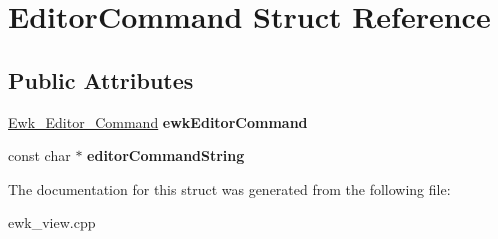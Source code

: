 \hypertarget{structEditorCommand}{\section{Editor\+Command Struct Reference}
\label{structEditorCommand}
}
\subsection*{Public Attributes}
\begin{DoxyCompactItemize}
\item 
\hypertarget{structEditorCommand_a4ef247e683d522e53cc8c693a7ab8b9f}{\hyperlink{ewk__view_8h_a0e80cc89f9b70518e512acc1969d3e6c}{Ewk\+\_\+\+Editor\+\_\+\+Command} {\bfseries ewk\+Editor\+Command}}\label{structEditorCommand_a4ef247e683d522e53cc8c693a7ab8b9f}

\item 
\hypertarget{structEditorCommand_adb3a06303fcba0f670c4c98ec450f5fe}{const char $\ast$ {\bfseries editor\+Command\+String}}\label{structEditorCommand_adb3a06303fcba0f670c4c98ec450f5fe}

\end{DoxyCompactItemize}


The documentation for this struct was generated from the following file\+:\begin{DoxyCompactItemize}
\item 
ewk\+\_\+view.\+cpp\end{DoxyCompactItemize}
